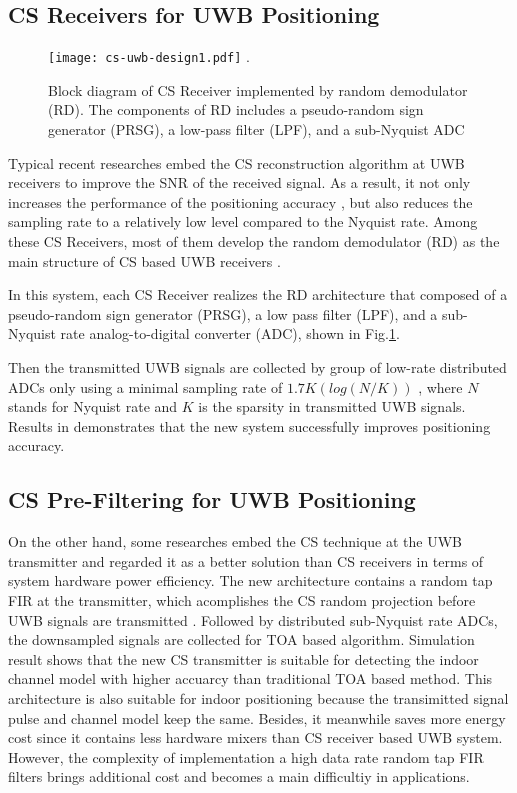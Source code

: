 \subsection{CS Receivers for UWB Positioning}
\begin{figure}[!t]
\centering
\texttt{[image: cs-uwb-design1.pdf]}
\DeclareGraphicsExtensions.
\caption{Block diagram of CS Receiver implemented by random demodulator (RD). The components of RD includes a pseudo-random sign generator (PRSG), a low-pass filter (LPF), and a sub-Nyquist ADC}
\label{cs-uwb-design1}
\end{figure}

Typical recent researches embed the CS reconstruction algorithm at UWB receivers to improve the SNR of the received signal. As a result, it not only increases the performance of the positioning accuracy \cite{banitalebi2014compressive}, but also reduces the sampling rate to a relatively low level compared to the Nyquist rate. Among these CS Receivers, most of them develop the random demodulator (RD) \cite{kirolos2006analog} as the main structure of CS based UWB receivers \cite{yang2011compressive}. 

In this system, each CS Receiver realizes the RD architecture that composed of a pseudo-random sign generator (PRSG), a low pass filter (LPF), and a sub-Nyquist rate analog-to-digital converter (ADC), shown in Fig.\ref{cs-uwb-design1}. 

Then the transmitted UWB signals are collected by group of low-rate distributed ADCs only using a minimal sampling rate of $1.7K(log(N/K))$ \cite{kirolos2006analog}, where $N$ stands for Nyquist rate and $K$ is the sparsity in transmitted UWB signals. Results in \cite{yang2013compressive} demonstrates that the new system successfully improves positioning accuracy. 

\subsection{CS Pre-Filtering for UWB Positioning}
On the other hand, some researches embed the CS technique at the UWB transmitter and regarded it as a better solution than CS receivers in terms of  system hardware power efficiency. The new architecture contains a random tap FIR at the transmitter, which acomplishes the CS random projection before UWB signals are transmitted \cite{zhang2009compressed}. Followed by distributed sub-Nyquist rate ADCs, the downsampled signals are collected for TOA based algorithm. Simulation result \cite{zhang2009compressed} shows that the new CS transmitter is suitable for detecting the indoor channel model with higher accuarcy than traditional TOA based method. This architecture is also suitable for indoor positioning because the transimitted signal pulse and channel model keep the same. Besides, it meanwhile saves more energy cost since it contains less hardware mixers than CS receiver based UWB system. However, the complexity of implementation a high data rate random tap FIR filters brings additional cost and becomes a main difficultiy in applications.

